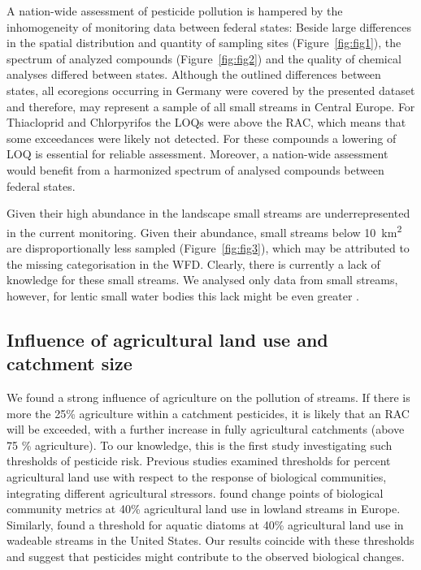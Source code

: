 \documentclass[journal=esthag,manuscript=article]{achemso}
\begin{document}
A nation-wide assessment of pesticide pollution is hampered by the inhomogeneity of monitoring data between federal states:
Beside large differences in the spatial distribution and quantity of sampling sites (Figure~\ref{fig:fig1}), the spectrum of analyzed compounds (Figure~\ref{fig:fig2}) and the quality of chemical analyses differed between states. 
Although the outlined differences between states, all ecoregions occurring in Germany \citep{illies1978limnofauna,abell2008freshwater} were covered by the presented dataset and therefore, may represent a sample of all small streams in Central Europe. 
For Thiacloprid and Chlorpyrifos the LOQs were above the RAC, which means that some exceedances were likely not detected.
For these compounds a lowering of LOQ is essential for reliable assessment.
Moreover, a nation-wide assessment would benefit from a harmonized spectrum of analysed compounds between federal states. 

Given their high abundance in the landscape \citep{nadeau_hydrological_2007} small streams are underrepresented in the current monitoring. 
Given their abundance, small streams below 10~km\textsuperscript{2} are disproportionally less sampled (Figure~\ref{fig:fig3}), which may be attributed to the missing categorisation in the WFD. 
Clearly, there is currently a lack of knowledge for these small streams.
We analysed only data from small streams, however, for lentic small water bodies this lack might be even greater \citep{lorenz_specifics_2016}. 



\subsection{Influence of agricultural land use and catchment size}
We found a strong influence of agriculture on the pollution of streams.
If there is more the 25\% agriculture within a catchment pesticides, it is likely that an RAC will be exceeded, with a further increase in fully agricultural catchments (above 75 \% agriculture).
To our knowledge, this is the first study investigating such thresholds of pesticide risk.
Previous studies examined thresholds for percent agricultural land use with respect to the response of biological communities, integrating different agricultural stressors.
\citet{feld_response_2013} found change points of biological community metrics at 40\% agricultural land use in lowland streams in Europe.
Similarly, \citet{waite_agricultural_2014} found a threshold for aquatic diatoms at 40\% agricultural land use in wadeable streams in the United States.
Our results coincide with these thresholds and suggest that pesticides might contribute to the observed biological changes. 
\end{document}
